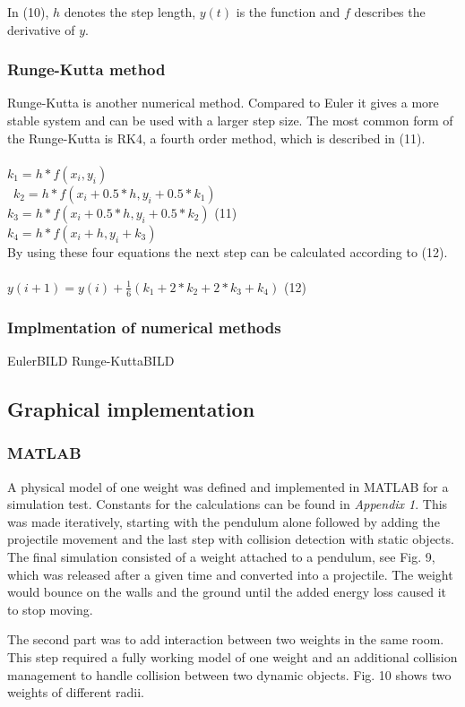 \documentclass[a4paper,12pt,twoside,english]{article}
\begin{document}
In (10), $h$ denotes the step length, $y(t)$ is the function and $f$ describes the derivative of $y$.
\subsubsection{Runge-Kutta method}
Runge-Kutta is another numerical method. Compared to Euler it gives a more stable system and can be used with a larger step size. The most common form of the Runge-Kutta is RK4, a fourth order method, which is described in (11).\\ \\
$k_1 = h*f(x_i, y_i) $ \\ \
$k_2 = h*f(x_i + 0.5*h, y_i + 0.5*k_1) $ \\
$k_3 = h*f(x_i + 0.5*h, y_i + 0.5*k_2)$ \hfill (11) \\
$k_4 = h*f(x_i + h, y_i + k_3)$ \\

By using these four equations the next step can be calculated according to (12). \\ \\
$ y(i+1) = y(i) + \frac{1}{6}( k_1 + 2*k_2 + 2*k_3 + k_4) $ \hfill (12)

\subsubsection{Implmentation of numerical methods}

EulerBILD
Runge-KuttaBILD

\subsection{Graphical implementation}
\subsubsection{MATLAB}
A physical model of one weight was defined and implemented in MATLAB for a simulation test. Constants for the calculations can be found in \textit{Appendix 1}. This was made iteratively, starting with the pendulum alone followed by adding the projectile movement and the last step with collision detection with static objects. The final simulation consisted of a weight attached to a pendulum, see Fig. 9, which was released after a given time and converted into a projectile. The weight would bounce on the walls and the ground until the added energy loss caused it to stop moving. 

The second part was to add interaction between two weights in the same room. This step required a fully working model of one weight and an additional collision management to handle collision between two dynamic objects. Fig. 10 shows two weights of different radii.
\end{document}
